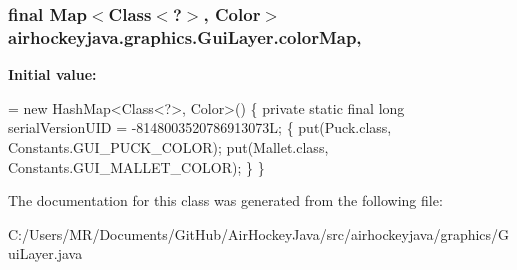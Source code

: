 \subsubsection[{color\+Map}]{\setlength{\rightskip}{0pt plus 5cm}final Map$<$Class$<$?$>$, Color$>$ airhockeyjava.\+graphics.\+Gui\+Layer.\+color\+Map\hspace{0.3cm}{\ttfamily [static]}, {\ttfamily [protected]}}\label{classairhockeyjava_1_1graphics_1_1_gui_layer_ab498fee3c3a46c6b2402bfff9cda7749}
{\bfseries Initial value\+:}
\begin{DoxyCode}
= \textcolor{keyword}{new} HashMap<Class<?>, Color>() \{
        \textcolor{keyword}{private} \textcolor{keyword}{static} \textcolor{keyword}{final} \textcolor{keywordtype}{long} serialVersionUID = -8148003520786913073L;
        \{
            put(Puck.class, Constants.GUI\_PUCK\_COLOR);
            put(Mallet.class, Constants.GUI\_MALLET\_COLOR);
        \}
    \}
\end{DoxyCode}


The documentation for this class was generated from the following file\+:\begin{DoxyCompactItemize}
\item 
C\+:/\+Users/\+M\+R/\+Documents/\+Git\+Hub/\+Air\+Hockey\+Java/src/airhockeyjava/graphics/Gui\+Layer.\+java\end{DoxyCompactItemize}
